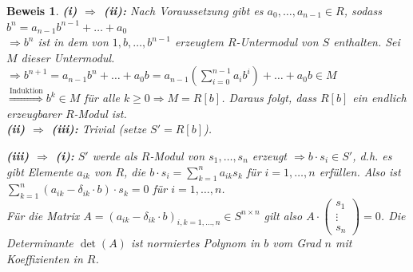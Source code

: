 \documentclass[a4paper,12pt]{scrbook}
\theoremstyle{break}
\theoremstyle{nonumberbreak}
\newtheorem{Bew}{Beweis}
\theoremstyle{nonumberplain}
\begin{document}
\begin{Bew} 
  \textbf{(i) $\Rightarrow$ (ii):} Nach Voraussetzung gibt es $a_0, \dots ,
  a_{n-1} \in R$, sodass $b^n = a_{n-1}
  b^{n-1} + \dots + a_0$\\
  $\Rightarrow b^n$ ist in dem von $1, b, \dots , b^{n-1}$
  erzeugtem $R$-Untermodul von $S$ enthalten. Sei $M$ dieser Untermodul.\\
  $\Rightarrow b^{n+1} = a_{n-1} b^n + \dots + a_0 b = a_{n-1}
  (\sum_{i=0}^{n-1} a_i b^i) + \dots + a_0 b \in M$\\
  $\overset{\text{Induktion}}{\Rightarrow} b^k \in M$ für alle $k \ge
  0 \Rightarrow M = R[b]$. Daraus folgt, dass $R[b]$ ein endlich erzeugbarer
  $R$-Modul ist.\\

  \textbf{(ii) $\Rightarrow$ (iii):} Trivial (setze $S' = R[b]$).

  \textbf{(iii) $\Rightarrow$ (i):} $S'$ werde als $R$-Modul von $s_1, \dots ,
  s_n$ erzeugt $\Rightarrow b \cdot s_i \in S'$, d.h. es gibt Elemente $a_{i k}$
  von $R$, die $b \cdot s_i = \sum_{k = 1}^n a_{i k} s_k$ für $i=1,\dots,n$
  erfüllen. Also ist
  $ \sum_{k = 1}^n (a_{i k} -\delta_{i k} \cdot b) \cdot s_k = 0$ für
  $i=1, \dots, n$.\\
  Für die Matrix $A = (a_{i k} - \delta_{i k} \cdot b)_{i,k =1, \dots, n} \in S
  ^{n \times n}$ gilt also $A \cdot \begin{pmatrix}s_1 \\ \vdots \\ s_n
  \end{pmatrix} = 0$. Die Determinante
  $\det(A)$ ist normiertes Polynom in $b$ vom Grad $n$ mit Koeffizienten in $R$.


\end{Bew}
\end{document}
